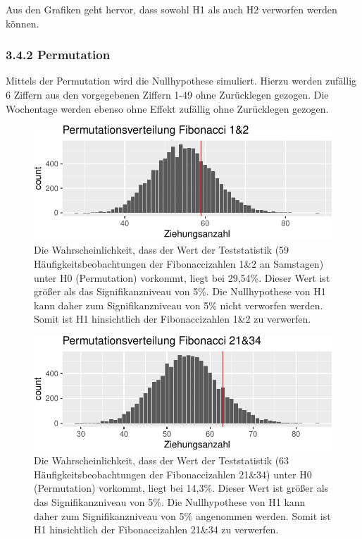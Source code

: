 \documentclass[ngerman,]{article}
\begin{document}
Aus den Grafiken geht hervor, dass sowohl H1 als auch H2 verworfen
werden können.

\subsubsection{3.4.2 Permutation}\label{permutation}

Mittels der Permutation wird die Nullhypothese simuliert. Hierzu werden
zufällig 6 Ziffern aus den vorgegebenen Ziffern 1-49 ohne Zurücklegen
gezogen. Die Wochentage werden ebenso ohne Effekt zufällig ohne
Zurücklegen gezogen.

\begin{figure}

\includegraphics{Abbildung/Permut_1_2-1} \hfill{}

\caption{Die Wahrscheinlichkeit, dass der Wert der Teststatistik (59 Häufigkeitsbeobachtungen der Fibonaccizahlen 1\&2 an Samstagen) unter H0 (Permutation) vorkommt, liegt bei 29,54\%. Dieser Wert ist größer als das Signifikanzniveau von 5\%. Die Nullhypothese von H1 kann daher zum Signifikanzniveau von 5\% nicht verworfen werden. Somit ist H1 hinsichtlich der Fibonaccizahlen 1\&2 zu verwerfen.}\label{fig:Permut_1_2}
\end{figure}

\begin{figure}

\includegraphics{Abbildung/Permut_21_34-1} \hfill{}

\caption{Die Wahrscheinlichkeit, dass der Wert der Teststatistik (63 Häufigkeitsbeobachtungen der Fibonaccizahlen 21\&34) unter H0 (Permutation) vorkommt, liegt bei 14,3\%. Dieser Wert ist größer als das Signifikanzniveau von 5\%. Die Nullhypothese von H1 kann daher zum Signifikanzniveau von 5\% angenommen werden. Somit ist H1 hinsichtlich der Fibonaccizahlen 21\&34 zu verwerfen.}\label{fig:Permut_21_34}
\end{figure}
\end{document}
